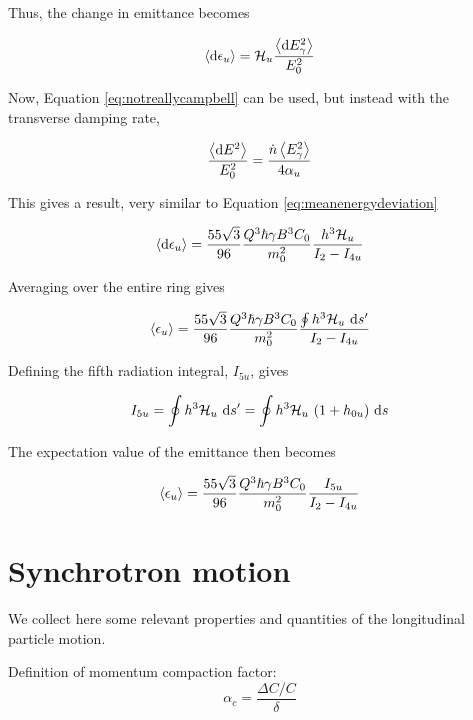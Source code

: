 Thus, the change in emittance becomes

\begin{equation}
    \left\langle {\text{d}\epsilon_u} \right\rangle = \mathcal{H}_u \frac{\left\langle {\text{d}E_\gamma^2} \right\rangle}{E_0^2}
\end{equation}

Now, Equation \eqref{eq:notreallycampbell} can be used, but instead with the transverse damping rate,

\begin{equation}
    \frac{\left\langle {\text{d}E^2} \right\rangle}{E_0^2} = \frac{\dot{n} \left\langle {E_\gamma^2} \right\rangle}{4 \alpha_u}
\end{equation}

This gives a result, very similar to Equation \eqref{eq:meanenergydeviation}

\begin{equation}
    \left\langle {\text{d}\epsilon_u} \right\rangle = \frac{55 \sqrt{3}}{96} \frac{Q^3 \hbar \gamma B^3 C_0}{m_0^2} \frac{h^3 \mathcal{H}_u}{I_2 - I_{4u}}
\end{equation}

Averaging over the entire ring gives

\begin{equation}
    \left\langle {\epsilon_u} \right\rangle = \frac{55 \sqrt{3}}{96} \frac{Q^3 \hbar \gamma B^3 C_0}{m_0^2} \frac{\oint h^3 \mathcal{H}_u\ \text{d} s'}{I_2 - I_{4u}}
\end{equation}

Defining the fifth radiation integral, $I_{5u}$, gives

\begin{equation}
    I_{5u} = \oint h^3 \mathcal{H}_u\ \text{d} s' = \oint h^3 \mathcal{H}_u\ (1 + h_{0u})\ \text{d} s
\end{equation}

The expectation value of the emittance then becomes

\begin{equation}
    \left\langle {\epsilon_u} \right\rangle = \frac{55 \sqrt{3}}{96} \frac{Q^3 \hbar \gamma B^3 C_0}{m_0^2} \frac{I_{5u}}{I_2 - I_{4u}}
\end{equation}


\chapter{Synchrotron motion}
\label{ch:synchmon}

We collect here some relevant properties and quantities of the longitudinal particle motion.

Definition of momentum compaction factor:
\begin{equation}
\alpha_c = 
\frac{\Delta C/C}\delta
\end{equation}

